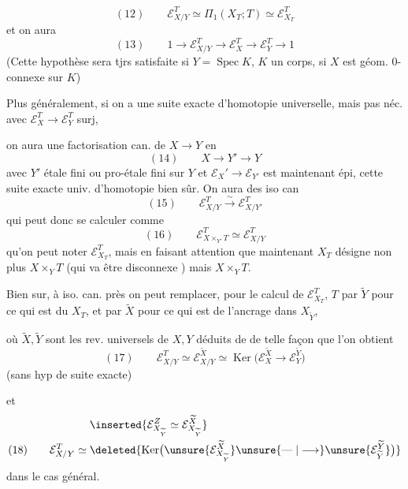 \[
(12)\qquad \mathcal E_{X/Y}^T\simeq\Pi_1(X_T;T)\simeq\mathcal E_{X_T}^T
\]
et on aura
\[
(13)\qquad 1\longrightarrow\mathcal E_{X/Y}^T\longrightarrow\mathcal E_X^T\longrightarrow\mathcal E_Y^T\longrightarrow1
\]
(Cette hypothèse sera tjrs satisfaite si $Y=\operatorname{Spec}K$, $K$ un corps, si $X$ est géom. $0$-connexe sur $K$)

Plus généralement, si on a une suite exacte d'homotopie universelle, mais pas néc. avec $\mathcal E_X^T\longrightarrow\mathcal E_Y^T$ surj,




on aura une factorisation can. de
$X\longrightarrow Y$ en
\[
(14)\qquad X\longrightarrow Y'\longrightarrow Y
\]
avec $Y'$ étale fini ou pro-étale fini sur $Y$
et $\mathcal E_X'\longrightarrow\mathcal E_{Y'}$ est maintenant épi,
 cette suite exacte univ. d'homotopie
bien sûr. On aura des iso can
\[
(15)\qquad \mathcal E_{X/Y}^T\xrightarrow{\sim}\mathcal E_{X/Y'}^T
\]
qui peut donc se calculer comme
\[
(16)\qquad \mathcal E_{X\times_{Y'}T}^T\simeq\mathcal E_{X/Y}^T
\]
qu'on peut noter $\mathcal E_{X_T}^T$, mais en
faisant attention que maintenant
$X_T$ désigne non plus $X\times_YT$ (qui
va être disconnexe ) mais $X\times_YT$.

Bien sur, à iso. can. près on peut
 remplacer, pour le calcul de $\mathcal E_{X_T}^T$,
$T$ par $\widetilde Y$ pour ce qui est du $X_T$, et par
$\widetilde X$ pour ce qui est de l'ancrage dans $X_{\widetilde Y}$,



où $\widetilde X,\widetilde Y$ sont les rev. universels de $X,Y$ déduits de  de telle façon que l'on obtient
\[
(17)\qquad \mathcal E_{X/Y}^T\simeq\mathcal E_{X/Y}^{\widetilde X}\simeq\operatorname{Ker}\bigl(\mathcal E_X^{\widetilde X}\longrightarrow\mathcal E_Y^{\widetilde Y}\bigr)
\]
(sans hyp de suite exacte)

et
\[
\begin{aligned}
&\inserted{\mathcal E_{X_{\widetilde Y}}^Z\simeq\mathcal E_{X_{\widetilde Y}}^{\widetilde X}}\\
(18)\qquad \mathcal E_{X/Y}^T\simeq{}&\deleted{\operatorname{Ker}\bigl(\unsure{\mathcal E_{X_{\widetilde Y}}^{\widetilde X}}\unsure{\mathrel{\text{---}}|\longrightarrow}\unsure{\mathcal E_{\widetilde Y}^{\widetilde Y}}\bigr)}
\end{aligned}
\]
dans le cas général.

